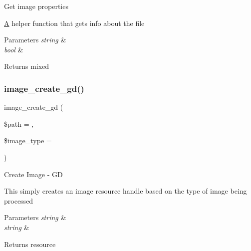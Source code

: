 Get image properties

\mbox{\hyperlink{class_a}{A}} helper function that gets info about the file


\begin{DoxyParams}{Parameters}
{\em string} & \\
\hline
{\em bool} & \\
\hline
\end{DoxyParams}
\begin{DoxyReturn}{Returns}
mixed 
\end{DoxyReturn}
\mbox{\label{class_c_i___image__lib_a1a222111448274ffca4e59d8a473c5fc}} 
\subsubsection{\texorpdfstring{image\+\_\+create\+\_\+gd()}{image\_create\_gd()}}
{\footnotesize\ttfamily image\+\_\+create\+\_\+gd (\begin{DoxyParamCaption}\item[{}]{\$path = {\ttfamily \textquotesingle{}\textquotesingle{}},  }\item[{}]{\$image\+\_\+type = {\ttfamily \textquotesingle{}\textquotesingle{}} }\end{DoxyParamCaption})}

Create Image -\/ GD

This simply creates an image resource handle based on the type of image being processed


\begin{DoxyParams}{Parameters}
{\em string} & \\
\hline
{\em string} & \\
\hline
\end{DoxyParams}
\begin{DoxyReturn}{Returns}
resource 
\end{DoxyReturn}
\mbox{\label{class_c_i___image__lib_af641d1806701b178dfba3dbf7da54462}} 

